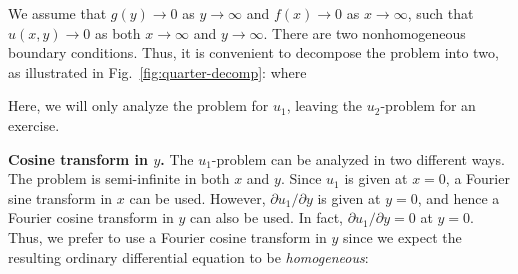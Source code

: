 We assume that $g(y) \to 0$ as $y \to \infty$ and $f(x) \to 0$ as $x \to \infty$, such that $u(x,y) \to 0$ as both $x \to \infty$ and $y \to \infty$.  There are two nonhomogeneous boundary conditions.  Thus, it is convenient to decompose the problem into two, as illustrated in Fig.~\ref{fig:quarter-decomp}:
where

Here, we will only analyze the problem for $u_1$, leaving the $u_2$-problem for an exercise.

\textbf{Cosine transform in $y$.}  The $u_1$-problem can be analyzed in two different ways.  The problem is semi-infinite in both $x$ and $y$.  Since $u_1$ is given at $x = 0$, a Fourier sine transform in $x$ can be used.  However, $\partial u_1/\partial y$ is given at $y = 0$, and hence a Fourier cosine transform in $y$ can also be used.  In fact, $\partial u_1/\partial y = 0$ at $y = 0$.  Thus, we prefer to use a Fourier cosine transform in $y$ since we expect the resulting ordinary differential equation to be \textit{homogeneous}:

